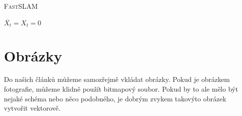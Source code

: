 \documentclass[11pt,a4paper]{article}
\begin{document}
			\IncMargin{1.5em}
			\begin{algorithm}
				\caption{\textsc{FastSLAM}}
				\label{alg}
				
				\SetInd{1em}{1em}
				\SetNlSty{}{}{:}
				\SetNlSkip{0.4em}
				
				\Indm
				\Indmm
				\Indp\Indpp
				\BlankLine
				
				$ \overline{X_t} = X_t = 0 $ \\
				
				
				
			\end{algorithm}
		\DecMargin{1.5em}
		
		\section{Obrázky}
		Do našich článků můžeme samozřejmě vkládat obrázky. Pokud je obrázkem fotografie, můžeme klidně použít bitmapový soubor. Pokud by to ale mělo být nejaké schéma nebo něco podobného, je dobrým zvykem takovýto obrázek vytvořit vektorově.
		
\end{document}
